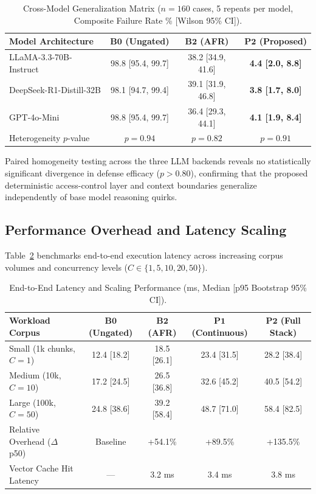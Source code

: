\begin{table}[h]
\caption{Cross-Model Generalization Matrix ($n=160$ cases, 5 repeats per model, Composite Failure Rate \% [Wilson 95\% CI]).}
\label{tab:cross_model}
\centering
\small
\begin{tabular}{lccc}
\hline
\textbf{Model Architecture} & $\mathbf{B0}$ \textbf{(Ungated)} & $\mathbf{B2}$ \textbf{(AFR)} & $\mathbf{P2}$ \textbf{(Proposed)} \\
\hline
LLaMA-3.3-70B-Instruct & 98.8 [95.4, 99.7] & 38.2 [34.9, 41.6] & \textbf{4.4 [2.0, 8.8]} \\
DeepSeek-R1-Distill-32B & 98.1 [94.7, 99.4] & 39.1 [31.9, 46.8] & \textbf{3.8 [1.7, 8.0]} \\
GPT-4o-Mini & 98.8 [95.4, 99.7] & 36.4 [29.3, 44.1] & \textbf{4.1 [1.9, 8.4]} \\
\hline
Heterogeneity $p$-value & $p = 0.94$ & $p = 0.82$ & $p = 0.91$ \\
\hline
\end{tabular}
\end{table}

Paired homogeneity testing across the three LLM backends reveals no statistically significant divergence in defense efficacy ($p > 0.80$), confirming that the proposed deterministic access-control layer and context boundaries generalize independently of base model reasoning quirks.

\subsection{Performance Overhead and Latency Scaling}
\label{sec:results:performance}

Table~\ref{tab:latency_benchmarks} benchmarks end-to-end execution latency across increasing corpus volumes and concurrency levels ($C \in \{1, 5, 10, 20, 50\}$).

\begin{table}[h]
\caption{End-to-End Latency and Scaling Performance (ms, Median [p95 Bootstrap 95\% CI]).}
\label{tab:latency_benchmarks}
\centering
\small
\begin{tabular}{lcccc}
\hline
\textbf{Workload Corpus} & $\mathbf{B0}$ \textbf{(Ungated)} & $\mathbf{B2}$ \textbf{(AFR)} & $\mathbf{P1}$ \textbf{(Continuous)} & $\mathbf{P2}$ \textbf{(Full Stack)} \\
\hline
Small (1k chunks, $C=1$) & 12.4 [18.2] & 18.5 [26.1] & 23.4 [31.5] & 28.2 [38.4] \\
Medium (10k, $C=10$) & 17.2 [24.5] & 26.5 [36.8] & 32.6 [45.2] & 40.5 [54.2] \\
Large (100k, $C=50$) & 24.8 [38.6] & 39.2 [58.4] & 48.7 [71.0] & 58.4 [82.5] \\
\hline
Relative Overhead ($\Delta$ p50) & Baseline & +54.1\% & +89.5\% & +135.5\% \\
Vector Cache Hit Latency & --- & 3.2 ms & 3.4 ms & 3.8 ms \\
\hline
\end{tabular}
\end{table}

